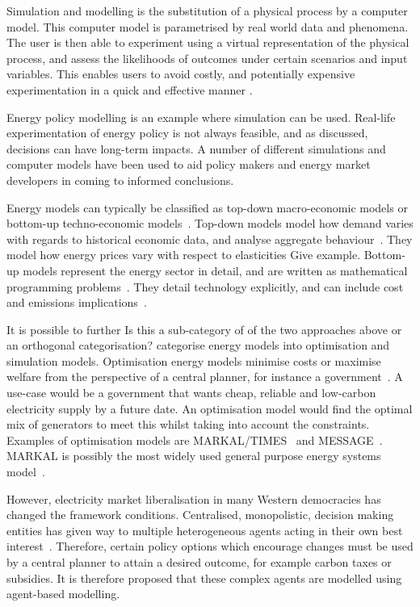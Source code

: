 Simulation and modelling is the substitution of a physical process by a computer model. This computer model is parametrised by real world data and phenomena. The user is then able to experiment using a virtual representation of the physical process, and assess the likelihoods of outcomes under certain scenarios and input variables. This enables users to avoid costly, and potentially expensive experimentation in a quick and effective manner \cite{Law:603360}. 

Energy policy modelling is an example where simulation can be used. Real-life experimentation of energy policy is not always feasible, and as discussed, decisions can have long-term impacts. A number of different simulations and computer models have been used to aid policy makers and energy market developers in coming to informed conclusions.

Energy models can typically be classified as top-down macro-economic models or bottom-up techno-economic models~\cite{Bohringer1998}. Top-down models model how demand varies with regards to historical economic data, and analyse aggregate behaviour~\cite{Hall2016}. They model how energy prices vary with respect to elasticities {\color{red}Give example}. Bottom-up models represent the energy sector in detail, and are written as mathematical programming problems~\cite{Gargiulo2013}. They detail technology explicitly, and can include cost and emissions implications~\cite{Hall2016}.

It is possible to further {\color{red}Is this a sub-category of of the two approaches above or an orthogonal categorisation?} categorise energy models into optimisation and simulation models. Optimisation energy models minimise costs or maximise welfare from the perspective of a central planner, for instance a government~\cite{Keles2017}. A use-case would be a government that wants cheap, reliable and low-carbon electricity supply by a future date. An optimisation model would find the optimal mix of generators to meet this whilst taking into account the constraints. Examples of optimisation models are MARKAL/TIMES~\cite{Fishbone1981} and MESSAGE~\cite{Schrattenholzer1981}. MARKAL is possibly the most widely used general purpose energy systems model~\cite{Pfenninger2014}.

However, electricity market liberalisation in many Western democracies has changed the framework conditions. Centralised, monopolistic, decision making entities has given way to multiple heterogeneous agents acting in their own best interest~\cite{Most2010}. Therefore, certain policy options which encourage changes must be used by a central planner to attain a desired outcome, for example carbon taxes or subsidies. It is therefore proposed that these complex agents are modelled using agent-based modelling.


